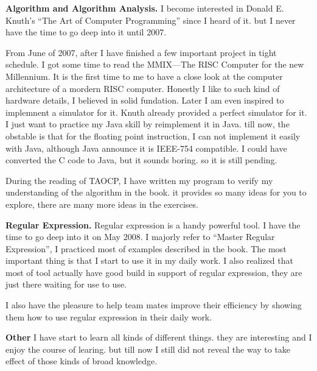 \medskip\noindent
{\bf Algorithm and Algorithm Analysis.}
I become interested in Donald E. Knuth's ``The Art of Computer Programming'' 
since I heard of it. but I never have the time to go deep into it until 2007.

From June of 2007, after I have finished a few important project in tight 
schedule. I got some time to read the MMIX---The RISC Computer for the new 
Millennium. It is the first time to me to have a close look at the computer 
architecture of a mordern RISC computer. Honestly I like to such kind of 
hardware details, I believed in solid fundation. Later I am even inspired to 
implemnent a simulator for it. Knuth already provided a perfect simulator for 
it. I just want to practice my Java skill by reimplement it in Java. till now, 
the obstable is that for the floating point instruction, I can not implement it
easily with Java, although Java announce it is IEEE-754 compatible.   I could 
have converted the C code to Java, but it sounds  boring. so it is still
 pending. 
 
During the reading of TAOCP, I have written my program to verify my 
understanding
of the algorithm in the book. it provides so many ideas for you to explore, 
there are many more ideas in the exercises. 

\medskip\noindent
{\bf Regular Expression.}
Regular expression is a handy powerful tool. I have the time to go deep into it
on May 2008. I majorly refer to ``Master Regular Expression'', I practiced most 
of examples described in the book. The most important thing is that I start to
use it in my daily work. I also realized that most of tool actually have good 
build in
support of regular expression, they are just there waiting for use to use.

I also have the pleasure to help team mates improve their efficiency by showing 
them how to use regular expression in their daily work.

\medskip\noindent
{\bf Other}
I have start to learn all kinds of different things. they are interesting and I
enjoy the course of learing. but till now I still did not reveal the way to 
take effect of those kinds of broad knowledge.   
 
 \bye
